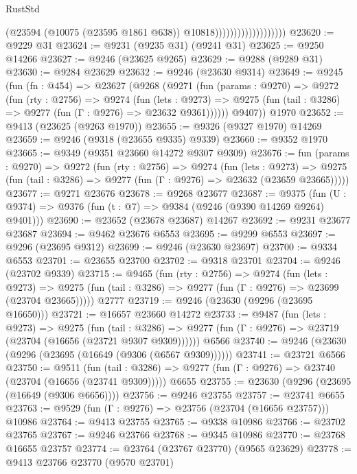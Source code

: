 \begin{lexlean}{RustStd}
\begin{coremodule}
                                        (@23594
                                          (@10075 (@23595 @1861 @638))
                                          @10818)))))))))))))))))))
@23620 := @9229 @31
@23624 := @9231 (@9235 @31) (@9241 @31)
@23625 := @9250 @14266
@23627 := @9246 (@23625 @9265)
@23629 := @9288 (@9289 @31)
@23630 := @9284 @23629
@23632 := @9246 (@23630 @9314)
@23649 := @9245
    (fun (fn : @454) =>
    @23627
      (@9268
        (@9271
          (fun (params : @9270) =>
          @9272
            (fun (rty : @2756) =>
            @9274
              (fun (lets : @9273) =>
              @9275 (fun (tail : @3286) => @9277 (fun (Γ : @9276) => @23632 @9361))))))
        @9407))
    @1970
@23652 := @9413 (@23625 (@9263 @1970))
@23655 := @9326 (@9327 @1970) @14269
@23659 := @9246 (@9318 (@23655 @9335) @9339)
@23660 := @9352 @1970
@23665 := @9349 (@9351 @23660 @14272 @9307 @9309)
@23676 := fun (params : @9270) =>
  @9272
    (fun (rty : @2756) =>
    @9274
      (fun (lets : @9273) =>
      @9275 (fun (tail : @3286) => @9277 (fun (Γ : @9276) => @23632 (@23659 @23665)))))
@23677 := @9271 @23676
@23678 := @9268 @23677
@23687 := @9375
    (fun (U : @9374) => @9376 (fun (t : @7) => @9384 (@9246 (@9390 @14269 @9264) @9401)))
@23690 := @23652 (@23678 @23687) @14267
@23692 := @9231 @23677 @23687
@23694 := @9462 @23676 @6553
@23695 := @9299 @6553
@23697 := @9296 (@23695 @9312)
@23699 := @9246 (@23630 @23697)
@23700 := @9334 @6553
@23701 := @23655 @23700
@23702 := @9318 @23701
@23704 := @9246 (@23702 @9339)
@23715 := @9465
    (fun (rty : @2756) =>
    @9274
      (fun (lets : @9273) =>
      @9275 (fun (tail : @3286) => @9277 (fun (Γ : @9276) => @23699 (@23704 @23665)))))
    @2777
@23719 := @9246 (@23630 (@9296 (@23695 @16650)))
@23721 := @16657 @23660 @14272
@23733 := @9487
    (fun (lets : @9273) =>
    @9275
      (fun (tail : @3286) =>
      @9277 (fun (Γ : @9276) => @23719 (@23704 (@16656 (@23721 @9307 @9309))))))
    @6566
@23740 := @9246 (@23630 (@9296 (@23695 (@16649 (@9306 (@6567 @9309))))))
@23741 := @23721 @6566
@23750 := @9511
    (fun (tail : @3286) => @9277 (fun (Γ : @9276) => @23740 (@23704 (@16656 (@23741 @9309)))))
    @6655
@23755 := @23630 (@9296 (@23695 (@16649 (@9306 @6656))))
@23756 := @9246 @23755
@23757 := @23741 @6655
@23763 := @9529 (fun (Γ : @9276) => @23756 (@23704 (@16656 @23757))) @10986
@23764 := @9413 @23755
@23765 := @9338 @10986
@23766 := @23702 @23765
@23767 := @9246 @23766
@23768 := @9345 @10986
@23770 := @23768 @16655 @23757
@23774 := @23764 (@23767 @23770) (@9565 @23629)
@23778 := @9413 @23766 @23770 (@9570 @23701)

\end{coremodule}
\end{lexlean}
